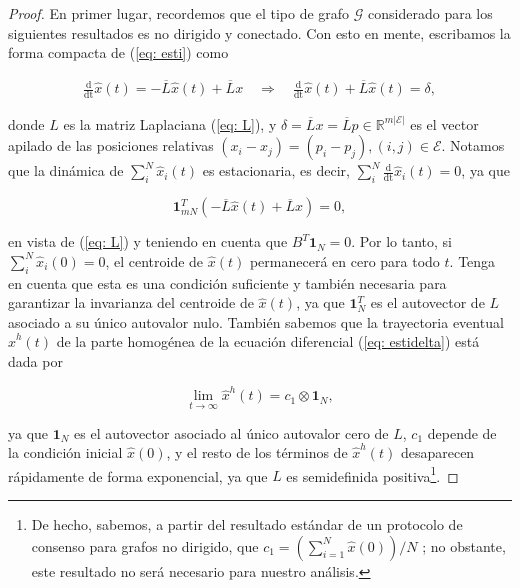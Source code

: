 \begin{proof}
En primer lugar, recordemos que el tipo de grafo $\mathcal{G}$ considerado para los siguientes resultados es no dirigido y conectado. Con esto en mente, escribamos la forma compacta de (\ref{eq: esti}) como

\begin{align} \label{eq: estidelta}
\frac{\mathrm{d}}{\mathrm{dt}} \hat x(t) = - \overline L\hat x(t) + \overline Lx \quad
\Rightarrow \quad \frac{\mathrm{d}}{\mathrm{dt}} \hat x(t) + \overline L\hat x(t) = \delta, 
\end{align}

donde $L$ es la matriz Laplaciana (\ref{eq: L}), y $\delta = \overline Lx = \overline Lp \in \mathbb{R}^{m|\mathcal{E}|}$ es el vector apilado de las posiciones relativas $(x_i-x_j) = (p_i - p_j), (i,j)\in\mathcal{E}$. Notamos que la dinámica de $\sum_i^N\hat x_i(t)$ es estacionaria, es decir, $\sum_i^N \frac{\mathrm{d}}{\mathrm{dt}}\hat x_i(t) = 0$, ya que

\begin{equation}\label{eq: invcen}
\mathbf{1}^T_{mN} \left(-\overline L\hat x(t) + \overline Lx\right) = 0,
\end{equation}

en vista de (\ref{eq: L}) y teniendo en cuenta que $B^T\mathbf{1}_N = 0$. Por lo tanto, si $\sum_i^N\hat x_i(0) = 0$, el centroide de $\hat x(t)$ permanecerá en cero para todo $t$. Tenga en cuenta que esta es una condición suficiente y también necesaria para garantizar la invarianza del centroide de $\hat x(t)$, ya que $\mathbf{1}^T_{N}$ es el autovector de $L$ asociado a su único autovalor nulo. También sabemos que la trayectoria eventual $\hat x^h(t)$ de la parte homogénea de la ecuación diferencial (\ref{eq: estidelta}) está dada por

\begin{equation} \label{eq: xh}
\lim_{t\to\infty}\hat x^h(t) = c_1 \otimes \mathbf{1}_N,
\end{equation}

ya que $\mathbf{1}_N$ es el autovector asociado al único autovalor cero de $L$, $c_1$ depende de la condición inicial $\hat x(0)$, y el resto de los términos de $\hat x^h(t)$ desaparecen rápidamente de forma exponencial, ya que $L$ es semidefinida positiva\footnote{De hecho, sabemos, a partir del resultado estándar de un protocolo de consenso para grafos no dirigido, que $c_1 = \left( \sum_{i=1}^N\hat x(0) \right) / N$ \cite{olfati2004consensus}; no obstante, este resultado no será necesario para nuestro análisis.}.


\end{proof}
